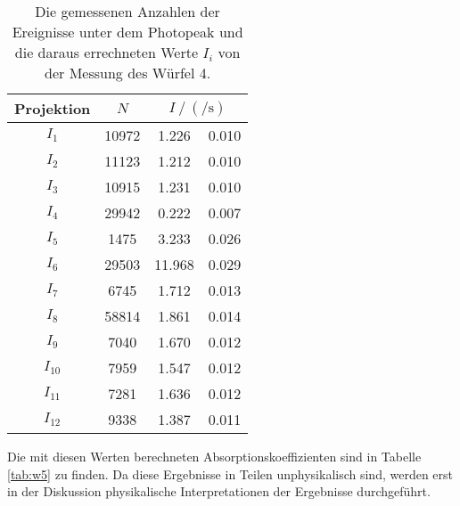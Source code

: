     \begin{table}[H]
    \centering
    \caption{Die gemessenen Anzahlen der Ereignisse unter dem Photopeak und die daraus errechneten Werte $I_i$ von der Messung des Würfel 4.}
    \label{tab:w4}
    \begin{tabular}{c S[table-format=4.0] S[table-format=2.3] @{${}\pm{}$} S[table-format=1.3] }
      \toprule
      {Projektion} &  &  \\
      \midrule
      $I_1 $   &  10972 & 1.226 & 0.010 \\
      $I_2 $   &  11123 & 1.212 & 0.010\\
      $I_3 $   &  10915 & 1.231 & 0.010\\
      $I_4 $   &  29942 & 0.222 & 0.007\\
      $I_5 $   &   1475 & 3.233 & 0.026\\
      $I_6 $   &  29503 & 11.968& 0.029 \\
      $I_7 $   &   6745 & 1.712 & 0.013\\
      $I_8 $   &  58814 & 1.861 & 0.014\\
      $I_9 $   &   7040 & 1.670 & 0.012\\
      $I_{10}$ &   7959 & 1.547 & 0.012\\
      $I_{11}$ &   7281 & 1.636 & 0.012\\
      $I_{12}$ &   9338 & 1.387 & 0.011\\
      \bottomrule
    \end{tabular}
  \end{table}
  Die mit diesen Werten berechneten Absorptionskoeffizienten sind in Tabelle \ref{tab:w5} zu finden.
  Da diese Ergebnisse in Teilen unphysikalisch sind, werden erst in der Diskussion physikalische Interpretationen der Ergebnisse durchgeführt.

